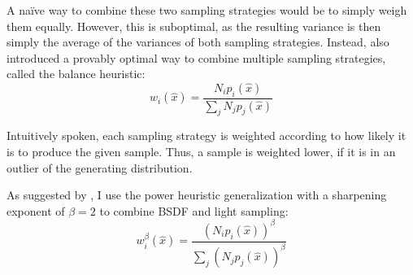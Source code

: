A naïve way to combine these two sampling strategies would be to simply weigh them equally.
However, this is suboptimal, as the resulting variance is then simply the average of the variances of both sampling strategies.
Instead, \textcite{veach1997} also introduced a provably optimal way to combine multiple sampling strategies, called the balance heuristic:
\begin{equation}
\label{eq:balance_heuristic}
    w_i(\hat{x}) = \frac{N_i p_i(\hat{x})}{\sum_{j} N_j p_j(\hat{x})}
\end{equation}

Intuitively spoken, each sampling strategy is weighted according to how likely it is to produce the given sample.
Thus, a sample is weighted lower, if it is in an outlier of the generating distribution.

As suggested by \textcite{veach1997}, I use the power heuristic generalization with a sharpening exponent of $\beta=2$ to combine BSDF and light sampling:
\begin{equation}
\label{eq:power_heuristic}
    w_i^{\beta}(\hat{x}) = \frac{(N_i p_i(\hat{x}))^\beta}{\sum_{j} (N_j p_j(\hat{x}))^{\beta}}
\end{equation}